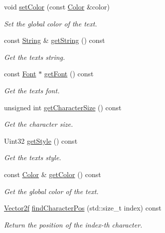\begin{DoxyCompactItemize}
void \hyperlink{classsf_1_1Text_afd1742fca1adb6b0ea98357250ffb634}{set\+Color} (const \hyperlink{classsf_1_1Color}{Color} \&color)
\begin{DoxyCompactList}\small\item\em Set the global color of the text. \end{DoxyCompactList}\item 
const \hyperlink{classsf_1_1String}{String} \& \hyperlink{classsf_1_1Text_a084c275eb4bca835696af5f8f9c80ab3}{get\+String} () const
\begin{DoxyCompactList}\small\item\em Get the text\textquotesingle{}s string. \end{DoxyCompactList}\item 
const \hyperlink{classsf_1_1Font}{Font} $\ast$ \hyperlink{classsf_1_1Text_a47cd96d7b2c37b2f820e4d6e1bb83f96}{get\+Font} () const
\begin{DoxyCompactList}\small\item\em Get the text\textquotesingle{}s font. \end{DoxyCompactList}\item 
unsigned int \hyperlink{classsf_1_1Text_a46d1d7f1d513bb8d434e985a93ea5224}{get\+Character\+Size} () const
\begin{DoxyCompactList}\small\item\em Get the character size. \end{DoxyCompactList}\item 
Uint32 \hyperlink{classsf_1_1Text_a0da79b0c057f4bb51592465a205c35d7}{get\+Style} () const
\begin{DoxyCompactList}\small\item\em Get the text\textquotesingle{}s style. \end{DoxyCompactList}\item 
const \hyperlink{classsf_1_1Color}{Color} \& \hyperlink{classsf_1_1Text_ae4ca753f719c54692fd4d9284573a2c7}{get\+Color} () const
\begin{DoxyCompactList}\small\item\em Get the global color of the text. \end{DoxyCompactList}\item 
\hyperlink{classsf_1_1Vector2}{Vector2f} \hyperlink{classsf_1_1Text_a2e252d8dcae3eb61c6c962c0bc674b12}{find\+Character\+Pos} (std\+::size\+\_\+t index) const
\begin{DoxyCompactList}\small\item\em Return the position of the {\itshape index-\/th} character. \end{DoxyCompactList}\item 

\end{DoxyCompactItemize}

